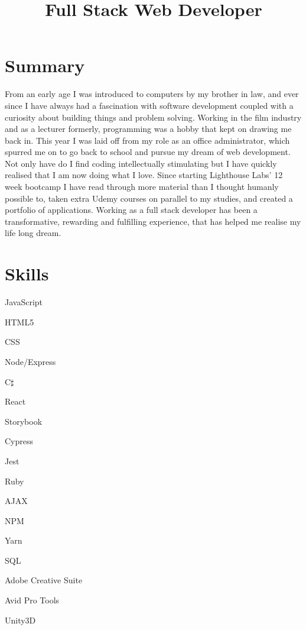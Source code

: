 \documentclass[11pt,a4paper,sans]{moderncv}
\title{Full Stack Web Developer} %
\begin{document}
\makecvtitle

\section{Summary} %
\label{sec:summary}

From an early age I was introduced to computers by my brother in law, and ever since I have always had a fascination with software development coupled with a curiosity about building things and problem solving. Working in the film industry and as a lecturer formerly, programming was a hobby that kept on drawing me back in. This year I was laid off from my role as an office administrator, which spurred me on to go back to school and pursue my dream of web development. Not only have do I find coding intellectually stimulating but I have quickly realised that I am now doing what I love. Since starting Lighthouse Labs' 12 week bootcamp I have read through more material than I thought humanly possible to, taken extra Udemy courses on parallel to my studies, and created a portfolio of applications. Working as a full stack developer has been a transformative, rewarding and fulfilling experience, that has helped me realise my life long dream.

\section{Skills}
\begin{itemize}
\begin{multicols}{3}
\item JavaScript
\item HTML5
\item CSS
\item Node/Express
\item C$\sharp$ 
\item React
\item Storybook
\item Cypress
\item Jest
\item Ruby
\item AJAX
\item NPM
\item Yarn
\item SQL
\item Adobe Creative Suite
\item Avid Pro Tools
\item Unity3D
\end{multicols}
\end{itemize}
\end{document}
